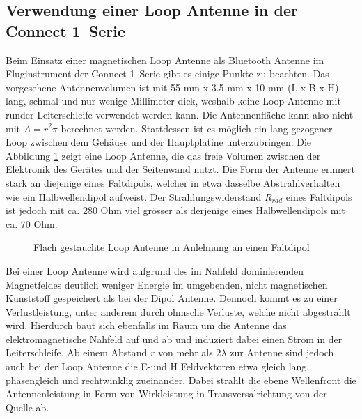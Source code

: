 \subsection{Verwendung einer Loop Antenne in der \glqq Connect 1\grqq \ Serie}
Beim Einsatz einer magnetischen Loop Antenne als Bluetooth Antenne im Fluginstrument der \glqq Connect 1\grqq \ Serie gibt es einige Punkte zu beachten. Das vorgesehene Antennenvolumen ist mit 55 mm x 3.5 mm x 10 mm (L x B x H) lang, schmal und nur wenige Millimeter dick, weshalb keine Loop Antenne mit runder Leiterschleife verwendet werden kann. Die Antennenfläche kann also nicht mit $A=r^{2}\pi$ berechnet werden. Stattdessen ist es möglich ein lang gezogener Loop zwischen dem Gehäuse und der Hauptplatine unterzubringen. Die Abbildung \ref{fig:FflacheLoopAntenne} zeigt eine Loop Antenne, die das freie Volumen zwischen der Elektronik des Gerätes und der Seitenwand nutzt. Die Form der Antenne erinnert stark an diejenige eines Faltdipols, welcher in etwa dasselbe Abstrahlverhalten wie ein Halbwellendipol aufweist. Der Strahlungswiderstand $R_{rad}$ eines Faltdipols ist jedoch mit ca. 280 Ohm viel grösser als derjenige eines Halbwellendipols mit ca. 70 Ohm.

\begin{figure}[!ht]
	\begin{center}
	\end{center}
\caption{Flach gestauchte Loop Antenne in Anlehnung an einen Faltdipol}
\label{fig:FflacheLoopAntenne}
\end{figure}

Bei einer Loop Antenne wird aufgrund des im Nahfeld dominierenden Magnetfeldes deutlich weniger Energie im umgebenden, nicht magnetischen Kunststoff gespeichert als bei der Dipol Antenne. Dennoch kommt es zu einer Verlustleistung, unter anderem durch ohmsche Verluste, welche nicht abgestrahlt wird. Hierdurch baut sich ebenfalls im Raum um die Antenne das elektromagnetische Nahfeld auf und ab und induziert dabei einen Strom in der Leiterschleife.
Ab einem Abstand $r$ von mehr als $2\lambda$ zur Antenne sind jedoch auch bei der Loop Antenne die E-und H Feldvektoren etwa gleich lang, phasengleich und rechtwinklig zueinander. Dabei strahlt die ebene Wellenfront die Antennenleistung in Form von Wirkleistung in Transversalrichtung von der Quelle ab.\\

